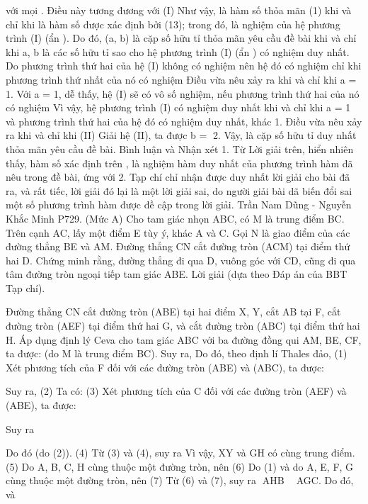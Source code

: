 \begin{multicols}{2}
{	với mọi  .
	Điều này tương đương với
	(I)
	Như vậy,   là hàm số thỏa mãn (1) khi và chỉ khi   là hàm số được xác định bởi (13); trong đó,   là nghiệm của hệ phương trình (I) (ẩn  ).
	Do đó, (a, b) là cặp số hữu tỉ thỏa mãn yêu cầu đề bài khi và chỉ khi a, b là các số hữu tỉ sao cho hệ phương trình (I) (ẩn  ) có nghiệm duy nhất.
	Do phương trình thứ hai của hệ (I) không có nghiệm   nên hệ đó có nghiệm chỉ khi phương trình thứ nhất của nó có nghiệm   Điều vừa nêu xảy ra khi và chỉ khi a = 1.
	Với a = 1, dễ thấy, hệ (I) sẽ có vô số nghiệm, nếu phương trình thứ hai của nó có nghiệm  
	Vì vậy, hệ phương trình (I) có nghiệm duy nhất khi và chỉ khi a = 1 và phương trình thứ hai của hệ đó có nghiệm duy nhất, khác 1. Điều vừa nêu xảy ra khi và chỉ khi
	(II)
	Giải hệ (II), ta được b = 2.
	Vậy,   là cặp số hữu tỉ duy nhất thỏa mãn yêu cầu đề bài.
	Bình luận và Nhận xét
	1. Từ Lời giải trên, hiển nhiên thấy, hàm số   xác định trên  , là nghiệm hàm duy nhất của phương trình hàm đã nêu trong đề bài, ứng với  
	2. Tạp chí chỉ nhận được duy nhất lời giải cho bài đã ra, và rất tiếc, lời giải đó lại là một lời giải sai, do người giải bài dã biến đổi sai một số phương trình hàm được đề cập trong lời giải.
	Trần Nam Dũng - Nguyễn Khắc Minh
	P729. (Mức A) Cho tam giác nhọn ABC, có M là trung điểm BC. Trên cạnh AC, lấy một điểm E tùy ý, khác A và C. Gọi N là giao điểm của các đường thẳng BE và AM. Đường thẳng CN cắt đường tròn (ACM) tại điểm thứ hai D. Chứng minh rằng, đường thẳng đi qua D, vuông góc với CD, cũng đi qua tâm đường tròn ngoại tiếp tam giác ABE.
	Lời giải (dựa theo Đáp án của BBT Tạp chí).
	
	Đường thẳng CN cắt đường tròn (ABE) tại hai điểm X, Y, cắt AB tại F, cắt đường tròn (AEF) tại điểm thứ hai G, và cắt đường tròn (ABC) tại điểm thứ hai H.
	Áp dụng định lý Ceva cho tam giác ABC với ba đường đồng qui AM, BE, CF, ta được:
	(do M là trung điểm BC).
	Suy ra,   Do đó, theo định lí Thales đảo,                                                                (1)
	Xét phương tích của F đối với các đường tròn (ABE) và (ABC), ta được:
	
	Suy ra,                                                                                                                                  (2)
	Ta có:
	(3)
	Xét phương tích của C đối với các đường tròn (AEF) và (ABE), ta được:
	
	Suy ra
	
	Do đó
	(do (2)).                                                      (4)
	Từ (3) và (4), suy ra  
	Vì vậy, XY và GH có cùng trung điểm.                                                                                                  (5)
	Do A, B, C, H cùng thuộc một đường tròn, nên
	(6)
	Do (1) và do A, E, F, G cùng thuộc một đường tròn, nên
	(7)
	Từ (6) và (7), suy ra AHB  AGC.
	Do đó,   và
	
}
\end{multicols}
